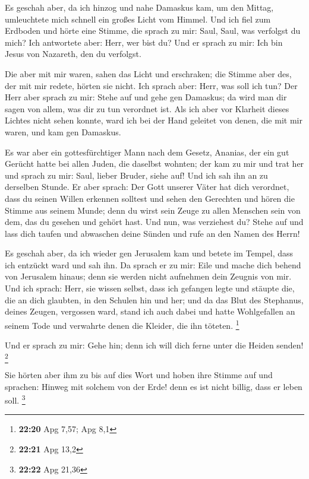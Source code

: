  Es geschah aber, da ich hinzog und nahe Damaskus kam, um
den Mittag, umleuchtete mich schnell ein großes Licht vom Himmel.
 Und ich fiel zum Erdboden und hörte eine Stimme, die
sprach zu mir: Saul, Saul, was verfolgst du mich?  Ich
antwortete aber: Herr, wer bist du? Und er sprach zu mir: Ich bin Jesus
von Nazareth, den du verfolgst.

 Die aber mit mir waren, sahen das Licht und erschraken;
die Stimme aber des, der mit mir redete, hörten sie nicht.
 Ich sprach aber: Herr, was soll ich tun? Der Herr aber
sprach zu mir: Stehe auf und gehe gen Damaskus; da wird man dir sagen
von allem, was dir zu tun verordnet ist.  Als ich aber
vor Klarheit dieses Lichtes nicht sehen konnte, ward ich bei der Hand
geleitet von denen, die mit mir waren, und kam gen Damaskus.

 Es war aber ein gottesfürchtiger Mann nach dem Gesetz,
Ananias, der ein gut Gerücht hatte bei allen Juden, die daselbst
wohnten;  der kam zu mir und trat her und sprach zu mir:
Saul, lieber Bruder, siehe auf! Und ich sah ihn an zu derselben Stunde.
 Er aber sprach: Der Gott unserer Väter hat dich
verordnet, dass du seinen Willen erkennen solltest und sehen den
Gerechten und hören die Stimme aus seinem Munde;  denn du
wirst sein Zeuge zu allen Menschen sein von dem, das du gesehen und
gehört hast.  Und nun, was verziehest du? Stehe auf und
lass dich taufen und abwaschen deine Sünden und rufe an den Namen des
Herrn!

 Es geschah aber, da ich wieder gen Jerusalem kam und
betete im Tempel, dass ich entzückt ward und sah ihn.  Da
sprach er zu mir: Eile und mache dich behend von Jerusalem hinaus; denn
sie werden nicht aufnehmen dein Zeugnis von mir.  Und ich
sprach: Herr, sie wissen selbst, dass ich gefangen legte und stäupte
die, die an dich glaubten, in den Schulen hin und her; 
und da das Blut des Stephanus, deines Zeugen, vergossen ward, stand ich
auch dabei und hatte Wohlgefallen an seinem Tode und verwahrte denen die
Kleider, die ihn töteten. \footnote{\textbf{22:20} Apg 7,57; Apg 8,1}

 Und er sprach zu mir: Gehe hin; denn ich will dich ferne
unter die Heiden senden! \footnote{\textbf{22:21} Apg 13,2}

 Sie hörten aber ihm zu bis auf dies Wort und hoben ihre
Stimme auf und sprachen: Hinweg mit solchem von der Erde! denn es ist
nicht billig, dass er leben soll. \footnote{\textbf{22:22} Apg 21,36}

